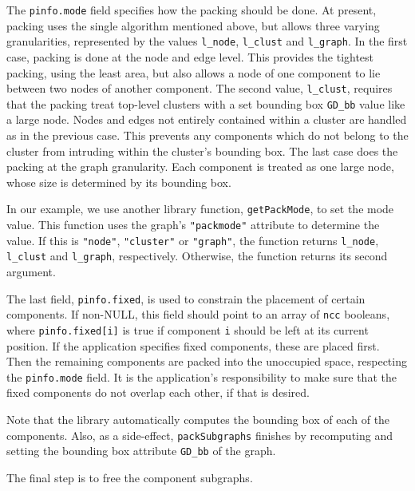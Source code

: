 The {\tt pinfo.mode} field specifies how the packing should be done. At
present, packing uses the single algorithm mentioned above, but allows
three varying granularities, represented by the values {\tt l\_node},
{\tt l\_clust} and {\tt l\_graph}. In the first case, packing is done at
the node and edge level. This provides the tightest packing, using the
least area, but also allows a node of one component to lie between
two nodes of another component. The second value, {\tt l\_clust}, 
requires that the packing treat top-level clusters with a set
bounding box {\tt GD\_bb} value like a large node. Nodes and edges not
entirely contained within a cluster are handled as in the previous
case. This prevents any components which do not belong to the cluster 
from intruding within the cluster's bounding box. The 
last case does the packing at the graph granularity. Each component
is treated as one large node, whose size is determined by its
bounding box.

In our example, we use another library function, {\tt getPackMode},
to set the mode value. This function uses the graph's {\tt "packmode"}
attribute to determine the value. If this is {\tt "node"},
{\tt "cluster"} or {\tt "graph"}, the function returns
{\tt l\_node}, {\tt l\_clust} and {\tt l\_graph}, respectively. 
Otherwise, the function returns its second argument.

The last field, {\tt pinfo.fixed}, is used to constrain the placement
of certain components. If non-NULL, this field should point to an
array of {\tt ncc} booleans, where {\tt pinfo.fixed[i]} is true if
component {\tt i} should be left at its current position. If the
application specifies fixed components, these are placed first. Then
the remaining components are packed into the unoccupied space, respecting
the {\tt pinfo.mode} field. It is the application's responsibility to
make sure that the fixed components do not overlap each other, if that
is desired.

Note that the library automatically computes the bounding box of
each of the components. Also,
as a side-effect, {\tt packSubgraphs} finishes by recomputing and
setting the bounding box attribute {\tt GD\_bb} of the graph.

The final step is to free the component subgraphs.

